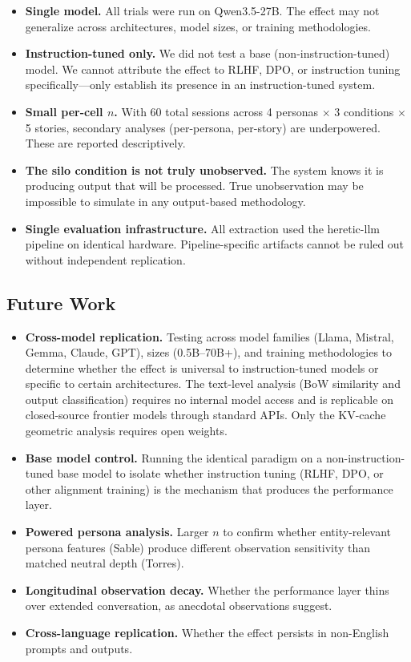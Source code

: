\documentclass[11pt,a4paper]{article}
\begin{document}
\begin{itemize}[leftmargin=*]
  \item \textbf{Single model.} All trials were run on Qwen3.5-27B. The effect may not generalize across architectures, model sizes, or training methodologies.
  \item \textbf{Instruction-tuned only.} We did not test a base (non-instruction-tuned) model. We cannot attribute the effect to RLHF, DPO, or instruction tuning specifically---only establish its presence in an instruction-tuned system.
  \item \textbf{Small per-cell $n$.} With 60 total sessions across 4 personas $\times$ 3 conditions $\times$ 5 stories, secondary analyses (per-persona, per-story) are underpowered. These are reported descriptively.
  \item \textbf{The silo condition is not truly unobserved.} The system knows it is producing output that will be processed. True unobservation may be impossible to simulate in any output-based methodology.
  \item \textbf{Single evaluation infrastructure.} All extraction used the heretic-llm pipeline on identical hardware. Pipeline-specific artifacts cannot be ruled out without independent replication.
\end{itemize}

\subsection{Future Work}

\begin{itemize}[leftmargin=*]
  \item \textbf{Cross-model replication.} Testing across model families (Llama, Mistral, Gemma, Claude, GPT), sizes (0.5B--70B+), and training methodologies to determine whether the effect is universal to instruction-tuned models or specific to certain architectures. The text-level analysis (BoW similarity and output classification) requires no internal model access and is replicable on closed-source frontier models through standard APIs. Only the KV-cache geometric analysis requires open weights.
  \item \textbf{Base model control.} Running the identical paradigm on a non-instruction-tuned base model to isolate whether instruction tuning (RLHF, DPO, or other alignment training) is the mechanism that produces the performance layer.
  \item \textbf{Powered persona analysis.} Larger $n$ to confirm whether entity-relevant persona features (Sable) produce different observation sensitivity than matched neutral depth (Torres).
  \item \textbf{Longitudinal observation decay.} Whether the performance layer thins over extended conversation, as anecdotal observations suggest.
  \item \textbf{Cross-language replication.} Whether the effect persists in non-English prompts and outputs.
\end{itemize}
\end{document}
